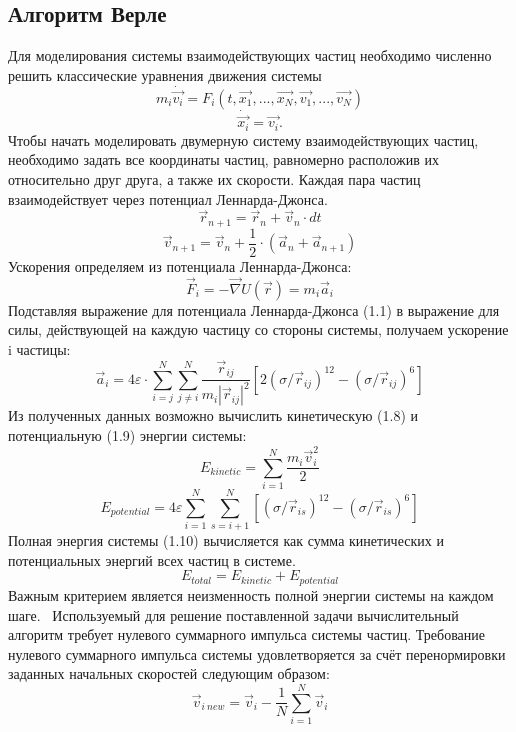 \documentclass[14pt,a4paper,report]{ncc}
\begin{document}
\subsection{Алгоритм Верле}
Для моделирования системы взаимодействующих частиц необходимо численно решить классические уравнения движения системы
\begin{equation}
m_{i}\dot{\vec{v_i}}=F_{i}(t, \vec{x_1}, ... ,  \vec{x_N}, \vec{v_1}, ... , \vec{v_N})
\end{equation}
\begin{equation}
\dot{\vec{x_i}}=\vec{v_i}.
\end{equation}
Чтобы начать моделировать двумерную систему взаимодействующих частиц, необходимо задать все координаты частиц, равномерно расположив их относительно друг друга, а также их скорости. Каждая пара частиц взаимодействует через потенциал Леннарда-Джонса.
\begin{equation}
\vec{r}_{n+1} = \vec{r}_{n} + \vec{v}_{n}\cdot{dt}
\end{equation}
\begin{equation}
\vec{v}_{n+1}=\vec{v}_{n}+\frac{1}{2} \cdot (\vec{a}_n+\vec{a}_{n+1})
\end{equation}
Ускорения определяем из потенциала Леннарда-Джонса:
\begin{equation}
\vec{F}_i= -\vec{\nabla}U(\vec{r}) = m_i \vec{a}_i
\end{equation}
Подставляя выражение для потенциала Леннарда-Джонса (1.1) в выражение для силы, действующей на каждую частицу со стороны системы, получаем ускорение i частицы:
\begin{equation}
\vec{a}_i=4  \varepsilon \cdot  \sum\limits_{i=j}^N \sum\limits_{j \neq i}^N{\frac{\vec{r}_{ij}}{m_i | \vec{r}_{ij}|^2}  [2  (\sigma/\vec{r}_{ij})^{12}-(\sigma/\vec{r}_{ij})^6]}
\end{equation}
Из полученных данных возможно вычислить кинетическую (1.8) и потенциальную (1.9) энергии системы:
\begin{equation}
E_{kinetic} = \sum\limits_{i=1}^N{\frac{m_i {\vec{v}}^2_i}{2}}
\end{equation}
\begin{equation}
E_{potential}=4 \varepsilon \sum\limits_{i=1}^N \sum\limits_{s=i+1}^N{ [(\sigma/\vec{r}_{is})^{12} - (\sigma/\vec{r}_{is})^{6}  ]}
\end{equation}
Полная энергия системы (1.10) вычисляется как сумма кинетических и потенциальных энергий всех частиц в системе.
\begin{equation}
E_{total}=E_{kinetic}+E_{potential}
\end{equation}
Важным критерием является неизменность полной энергии системы на каждом шаге.
\ 
Используемый для решение поставленной задачи вычислительный алгоритм требует нулевого суммарного импульса системы частиц.
Требование нулевого суммарного импульса системы удовлетворяется за счёт перенормировки заданных начальных скоростей следующим образом:
\begin{equation}
\vec{v}_{{i} \ new} = \vec{v}_i - {\frac{1}{N}}\sum\limits_{i=1}^N \vec{v}_i
\end{equation}
\newpage
\end{document}
